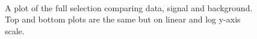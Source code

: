 \begin{figure}[htcb]
\begin{center}
\\
\caption{
A plot of the full selection comparing data, signal and background.  
Top and bottom plots are the same but on linear and log y-axis scale.}
\label{figs:bsMtwvsBkg1}
\end{center}
\end{figure}

